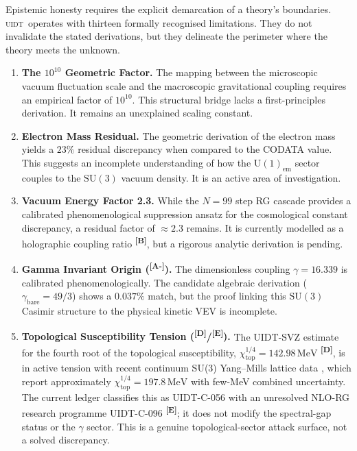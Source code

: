 \documentclass[12pt,a4paper,twoside]{article}
\theoremstyle{plain}
\theoremstyle{definition}
\theoremstyle{remark}
\newcommand{\UIDT}{\textsc{uidt}}
\newcommand{\catmark}[1]{\textsuperscript{\textsf{\textbf{[#1]}}}}
\newcommand{\GammaGeom}{16.339}                     %
\begin{document}
Epistemic honesty requires the explicit demarcation of a theory's boundaries.
\UIDT\ operates with thirteen formally recognised limitations. They do not
invalidate the stated derivations, but they delineate the perimeter where the
theory meets the unknown.

\begin{enumerate}[label=\textbf{L\arabic*:}, leftmargin=*]
  \item \textbf{The $10^{10}$ Geometric Factor.}
    The mapping between the microscopic vacuum fluctuation scale and the
    macroscopic gravitational coupling requires an empirical factor of $10^{10}$.
    This structural bridge lacks a first-principles derivation. It remains an
    unexplained scaling constant.

  \item \textbf{Electron Mass Residual.}
    The geometric derivation of the electron mass yields a $23\%$ residual
    discrepancy when compared to the CODATA value. This suggests an incomplete
    understanding of how the $\mathrm{U}(1)_{\mathrm{em}}$ sector couples to
    the $\mathrm{SU}(3)$ vacuum density. It is an active area of investigation.

  \item \textbf{Vacuum Energy Factor 2.3.}
    While the $N=99$ step RG cascade provides a calibrated phenomenological
    suppression ansatz for the cosmological constant discrepancy, a residual
    factor of $\approx 2.3$ remains. It is currently
    modelled as a holographic coupling ratio \catmark{B}, but a rigorous
    analytic derivation is pending.

  \item \textbf{Gamma Invariant Origin (\catmark{A-}).}
    The dimensionless coupling $\gamma = \GammaGeom$ is calibrated phenomenologically.
    The candidate algebraic derivation ($\gamma_{\mathrm{bare}} = 49/3$) shows a
    $0.037\%$ match, but the proof linking this $\mathrm{SU}(3)$ Casimir structure
    to the physical kinetic VEV is incomplete.

  \item \textbf{Topological Susceptibility Tension (\catmark{D}/\catmark{E}).}
    The UIDT-SVZ estimate for the fourth root of the topological susceptibility,
    $\chi_{\mathrm{top}}^{1/4}=142.98\,\mathrm{MeV}$ \catmark{D}, is in active
    tension with recent continuum SU(3) Yang--Mills lattice data
    \cite{DurrFuwa2025}, which report approximately
    $\chi_{\mathrm{top}}^{1/4}=197.8\,\mathrm{MeV}$ with few-MeV combined
    uncertainty. The current ledger classifies this as UIDT-C-056 with an
    unresolved NLO-RG research programme UIDT-C-096 \catmark{E}; it does not
    modify the spectral-gap status or the $\gamma$ sector. This is a genuine
    topological-sector attack surface, not a solved discrepancy.


\end{enumerate}
\end{document}
